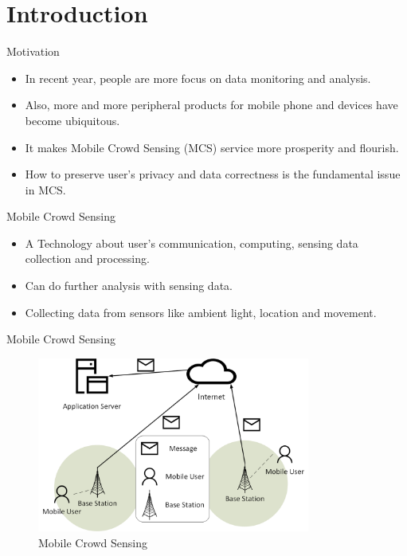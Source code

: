 \documentclass{beamer}
\begin{document}
\section{Introduction}
\begin{frame}{Motivation}
    \begin{itemize}
        \item {In recent year, people are more focus on data monitoring and analysis.}
        \item {Also, more and more peripheral products for mobile phone and devices have become ubiquitous.}
        \item {It makes Mobile Crowd Sensing (MCS)\cite{Guo14} service more prosperity and flourish.}
        \item {How to preserve user's privacy and data correctness is the fundamental issue in MCS.}
    \end{itemize}
\end{frame}
\begin{frame}{Mobile Crowd Sensing}
    \begin{itemize}
        \item {A Technology about user's communication, computing, sensing data collection and processing.}
        \item {Can do further analysis with sensing data.}
        \item {Collecting data from sensors like ambient light, location and movement.}
    \end{itemize}
\end{frame}
\begin{frame}{Mobile Crowd Sensing}
    \begin{figure}[t]
        \centering
        \includegraphics[width=0.8\textwidth]{figures/msc.png}
        \caption{Mobile Crowd Sensing}
    \end{figure}
\end{frame}
\end{document}
